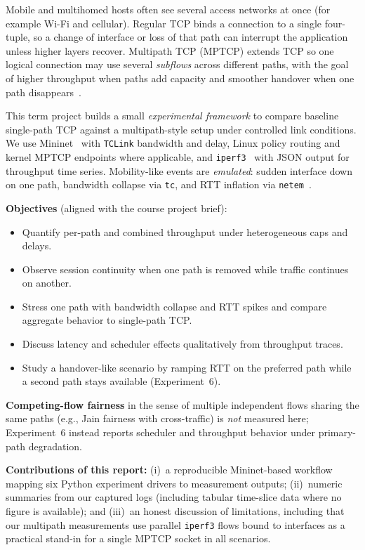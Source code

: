 \label{sec:intro}

Mobile and multihomed hosts often see several access networks at once (for example Wi-Fi and cellular). Regular TCP binds a connection to a single four-tuple, so a change of interface or loss of that path can interrupt the application unless higher layers recover. Multipath TCP (MPTCP) extends TCP so one logical connection may use several \emph{subflows} across different paths, with the goal of higher throughput when paths add capacity and smoother handover when one path disappears~\cite{rfc8684,Bonaventure2012usecases}.

This term project builds a small \emph{experimental framework} to compare baseline single-path TCP against a multipath-style setup under controlled link conditions. We use Mininet~\cite{Lantz2010mininet} with \texttt{TCLink} bandwidth and delay, Linux policy routing and kernel MPTCP endpoints where applicable, and \texttt{iperf3}~\cite{iperf3} with JSON output for throughput time series. Mobility-like events are \emph{emulated}: sudden interface down on one path, bandwidth collapse via \texttt{tc}, and RTT inflation via \texttt{netem}~\cite{linuxnetem}.

\textbf{Objectives} (aligned with the course project brief):
\begin{itemize}[noitemsep]
  \item Quantify per-path and combined throughput under heterogeneous caps and delays.
  \item Observe session continuity when one path is removed while traffic continues on another.
  \item Stress one path with bandwidth collapse and RTT spikes and compare aggregate behavior to single-path TCP.
  \item Discuss latency and scheduler effects qualitatively from throughput traces.
  \item Study a handover-like scenario by ramping RTT on the preferred path while a second path stays available (Experiment~6).
\end{itemize}
\textbf{Competing-flow fairness} in the sense of multiple independent flows sharing the same paths (e.g., Jain fairness with cross-traffic) is \emph{not} measured here; Experiment~6 instead reports scheduler and throughput behavior under primary-path degradation.

\textbf{Contributions of this report:} (i)~a reproducible Mininet-based workflow mapping six Python experiment drivers to measurement outputs; (ii)~numeric summaries from our captured logs (including tabular time-slice data where no figure is available); and (iii)~an honest discussion of limitations, including that our multipath measurements use parallel \texttt{iperf3} flows bound to interfaces as a practical stand-in for a single MPTCP socket in all scenarios.
